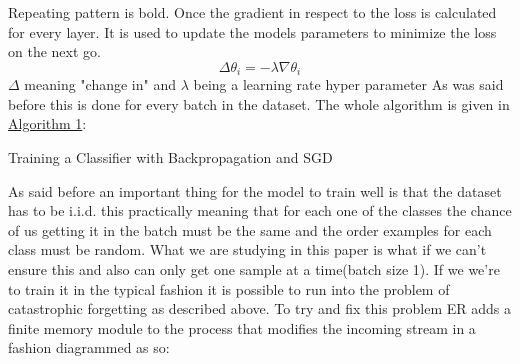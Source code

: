 \documentclass[oneside]{ctuthesis}
\begin{document}
Repeating pattern is bold.
Once the gradient in respect to the loss is calculated for every layer. It is used to update the models parameters to minimize the loss on the next go.
\[
    \Delta\theta_i = -\lambda \nabla \theta_i
\]
$\Delta$ meaning "change in" and $\lambda$ being a learning rate hyper parameter 
As was said before this is done for every batch in the dataset. The whole algorithm is given in \hyperref[alg:training]{Algorithm 1}:

\begin{algorithm}[t]
\SetAlgoNoEnd
{}

\caption{Training a Classifier with Backpropagation and SGD}
\label{alg:training}


\end{algorithm}

As said before an important thing for the model to train well is that the dataset has to be i.i.d. this practically meaning that for each one of the classes the chance of us getting it in the batch must be the same and the order examples for each class must be random.
What we are studying in this paper is what if we can't ensure this and also can only get one sample at a time(batch size 1). If we we're to train it in the typical fashion it is possible to run into the problem of catastrophic forgetting as described above.
To try and fix this problem ER adds a finite memory module to the process that modifies the incoming stream in a fashion diagrammed as so:
\end{document}
